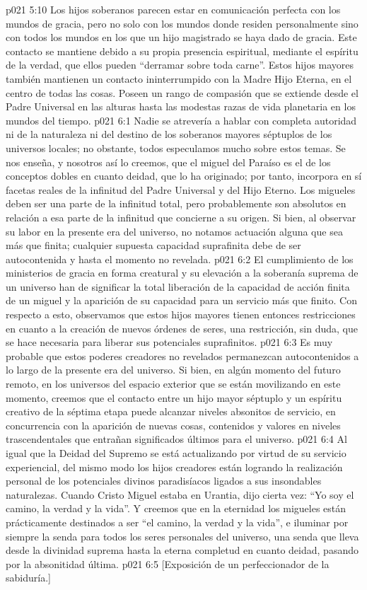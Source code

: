 \vs p021 5:10 Los hijos soberanos parecen estar en comunicación perfecta con los mundos de gracia, pero no solo con los mundos donde residen personalmente sino con todos los mundos en los que un hijo magistrado se haya dado de gracia. Este contacto se mantiene debido a su propia presencia espiritual, mediante el espíritu de la verdad, que ellos pueden “derramar sobre toda carne”. Estos hijos mayores también mantienen un contacto ininterrumpido con la Madre Hijo Eterna, en el centro de todas las cosas. Poseen un rango de compasión que se extiende desde el Padre Universal en las alturas hasta las modestas razas de vida planetaria en los mundos del tiempo.
\vs p021 6:1 Nadie se atrevería a hablar con completa autoridad ni de la naturaleza ni del destino de los soberanos mayores séptuplos de los universos locales; no obstante, todos especulamos mucho sobre estos temas. Se nos enseña, y nosotros así lo creemos, que el miguel del Paraíso es el  de los conceptos dobles en cuanto deidad, que lo ha originado; por tanto, incorpora en sí facetas reales de la infinitud del Padre Universal y del Hijo Eterno. Los migueles deben ser una parte de la infinitud total, pero probablemente son absolutos en relación a esa parte de la infinitud que concierne a su origen. Si bien, al observar su labor en la presente era del universo, no notamos actuación alguna que sea más que finita; cualquier supuesta capacidad suprafinita debe de ser autocontenida y hasta el momento no revelada.
\vs p021 6:2 El cumplimiento de los ministerios de gracia en forma creatural y su elevación a la soberanía suprema de un universo han de significar la total liberación de la capacidad de acción finita de un miguel y la aparición de su capacidad para un servicio más que finito. Con respecto a esto, observamos que estos hijos mayores tienen entonces restricciones en cuanto a la creación de nuevos órdenes de seres, una restricción, sin duda, que se hace necesaria para liberar sus potenciales suprafinitos.
\vs p021 6:3 Es muy probable que estos poderes creadores no revelados permanezcan autocontenidos a lo largo de la presente era del universo. Si bien, en algún momento del futuro remoto, en los universos del espacio exterior que se están movilizando en este momento, creemos que el contacto entre un hijo mayor séptuplo y un espíritu creativo de la séptima etapa puede alcanzar niveles absonitos de servicio, en concurrencia con la aparición de nuevas cosas, contenidos y valores en niveles trascendentales que entrañan significados últimos para el universo.
\vs p021 6:4 Al igual que la Deidad del Supremo se está actualizando por virtud de su servicio experiencial, del mismo modo los hijos creadores están logrando la realización personal de los potenciales divinos paradisíacos ligados a sus insondables naturalezas. Cuando Cristo Miguel estaba en Urantia, dijo cierta vez: “Yo soy el camino, la verdad y la vida”. Y creemos que en la eternidad los migueles están prácticamente destinados a ser “el camino, la verdad y la vida”, e iluminar por siempre la senda para todos los seres personales del universo, una senda que lleva desde la divinidad suprema hasta la eterna completud en cuanto deidad, pasando por la absonitidad última.
\vsetoff
\vs p021 6:5 [Exposición de un perfeccionador de la sabiduría.]
